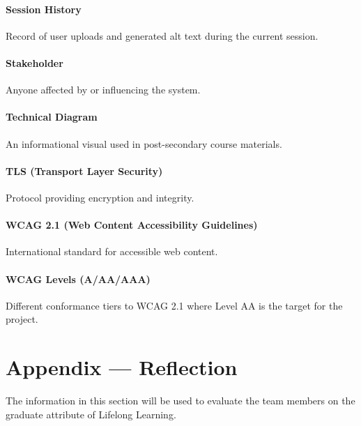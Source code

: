 \documentclass[12pt, titlepage]{article}
\begin{document}
\paragraph*{Session History}
 Record of user uploads and generated alt text during the current session.

 \paragraph*{Stakeholder}
 Anyone affected by or influencing the system.

 \paragraph*{Technical Diagram}
 An informational visual used in post-secondary course materials. 

 \paragraph*{TLS (Transport Layer Security)}
 Protocol providing encryption and integrity.

 \paragraph*{WCAG 2.1 (Web Content Accessibility Guidelines)}
 International standard for accessible web content.

 \paragraph*{WCAG Levels (A/AA/AAA)}
 Different conformance tiers to WCAG 2.1 where Level AA is the target for the project.


\newpage{}
\section*{Appendix --- Reflection}


The information in this section will be used to evaluate the team members on the
graduate attribute of Lifelong Learning.


\end{document}
